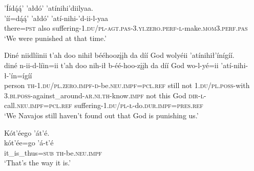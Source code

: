 \ea\label{ex:text9-15-7}
’Íídą́ą́’ ’ałdó’ ’atínihi’diilyaa.\\
\gll ’íí=dą́ą́’	’ałdó’	’atí-nihi-’d-ii-l-yaa\\
     there=\textsc{pst}	also	suffering-1.\textsc{du}/\textsc{pl}-\textsc{agt}.\textsc{pas}-3.\textsc{yi}.\textsc{zero}.\textsc{perf}-\textsc{l}-make.\textsc{mom}3.\textsc{perf}.\textsc{pas}\\
\glt `We were punished at that time.'
\z

\ea\label{ex:text9-15-8}
Diné niidlíinii t’ah doo nihił bééhoozįįh da díí God wolyéii ’atínihił’ínígíí.\\
\gll diné	n-ii-d-líin=ii	t’ah	doo	nih-ił	b-éé-hoo-zįįh	da	díí	God	wo-l-yé=ii	’atí-nihi-ł-’ín=ígíí\\
     person	\textsc{th}-1.\textsc{du}/\textsc{pl}.\textsc{zero}.\textsc{impf}-\textsc{d}-be.\textsc{neu}.\textsc{impf}=\textsc{pcl}.\textsc{ref}	still	not	1.\textsc{du}/\textsc{pl}.\textsc{poss}-with	3.\textsc{bi}.\textsc{poss}-against\_around-\textsc{ar}.\textsc{ni}.\textsc{th}-know.\textsc{impf}	not	this	God	\textsc{dir}-\textsc{l}-call.\textsc{neu}.\textsc{impf}=\textsc{pcl}.\textsc{ref}	suffering-1.\textsc{du}/\textsc{pl}-\textsc{ł}-do.\textsc{dur}.\textsc{impf}=\textsc{pres}.\textsc{ref}\\
\glt `We Navajos still haven't found out that God is punishing us.'
\z

\ea\label{ex:text9-15-9}
Kót’éego ’át’é.\\
\gll kót’ée=go	’á-t’é\\
     it\_is\_thus=\textsc{sub}	\textsc{th}-be.\textsc{neu}.\textsc{impf}\\
\glt `That's the way it is.'
\z
